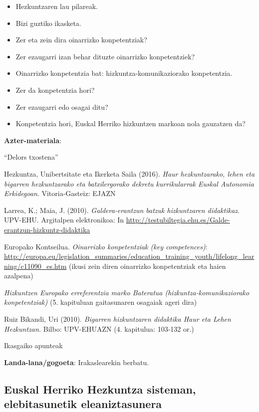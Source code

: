 \documentclass[
]{book}
\providecommand{\tightlist}{%
  \setlength{\itemsep}{0pt}\setlength{\parskip}{0pt}}
\begin{document}
\begin{itemize}
\tightlist
\item
  Hezkuntzaren lau pilareak.
\item
  Bizi guztiko ikasketa.
\item
  Zer eta zein dira oinarrizko konpetentziak?
\item
  Zer ezaugarri izan behar dituzte oinarrizko konpetentziek?
\item
  Oinarrizko konpetentzia bat: hizkuntza-komunikaziorako konpetentzia.
\item
  Zer da konpetentzia hori?
\item
  Zer ezaugarri edo osagai ditu?
\item
  Konpetentzia hori, Euskal Herriko hizkuntzen markoan nola gauzatzen da?
\end{itemize}

\textbf{Azter-materiala}:

``Delors txostena''

Hezkuntza, Unibertsitate eta Ikerketa Saila (2016). \emph{Haur hezkuntzarako, lehen eta bigarren hezkuntzarako eta batxilergorako dekretu kurrikularrak Euskal Autonomia Erkidegoan}. Vitoria-Gasteiz: EJAZN

Larrea, K.; Maia, J. (2010). \emph{Galdera-erantzun batzuk hizkuntzaren didaktikaz}. UPV-EHU. Argitalpen elektronikoa: In \url{http://testubiltegia.ehu.es/Galde-erantzun-hizkuntz-didaktika}

Europako Kontseilua. \emph{Oinarrizko konpetentziak (key competences)}: \url{http://europa.eu/legislation_summaries/education_training_youth/lifelong_learning/c11090_es.htm} (ikusi zein diren oinarrizko konpetentziak eta haien azalpena)

\emph{Hizkuntzen Europako erreferentzia marko Bateratua (hizkuntza-komunikaziorako konpetentziak)} (5. kapituluan gaitasunaren osagaiak ageri dira)

Ruiz Bikandi, Uri (2010). \emph{Bigarren hizkuntzaren didaktika Haur eta Lehen Hezkuntzan.} Bilbo: UPV-EHUAZN (4. kapitulua: 103-132 or.)

Ikasgaiko apunteak

\textbf{Landa-lana/gogoeta}: Irakaslearekin berbatu.

\hypertarget{euskal-herriko-hezkuntza-sisteman-elebitasunetik-eleaniztasunera}{%
\subsection*{Euskal Herriko Hezkuntza sisteman, elebitasunetik eleaniztasunera}\label{euskal-herriko-hezkuntza-sisteman-elebitasunetik-eleaniztasunera}}
\end{document}
